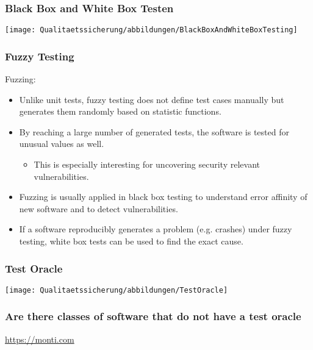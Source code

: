 
\begin{frame}
\frametitle{Black Box and White Box Testen}
  \begin{center}
  \texttt{[image: Qualitaetssicherung/abbildungen/BlackBoxAndWhiteBoxTesting]}
  \end{center}
\end{frame}


\begin{frame}
\frametitle{Fuzzy Testing}
Fuzzing:
\begin{itemize}
	\item Unlike unit tests, fuzzy testing does not define test cases manually but generates them randomly based on statistic functions.
	\item By reaching a large number of generated tests, the software is tested for unusual values as well.
\begin{itemize}
	\item This is especially interesting for uncovering security relevant vulnerabilities.
\end{itemize}
\item Fuzzing is usually applied in black box testing to understand error affinity of new software and to detect vulnerabilities.
\item If a software reproducibly generates a problem (e.g. crashes) under fuzzy testing, white box tests can be used to find the exact cause. 
\end{itemize}
\end{frame}


\begin{frame}
\frametitle{Test Oracle}
  \begin{center}
  \texttt{[image: Qualitaetssicherung/abbildungen/TestOracle]}
  \end{center}
\end{frame}


\begin{frame}
\frametitle{Are there classes of software that do not have a test oracle}
  \begin{center}
  \url{https://monti.com}  %
  \end{center}
\end{frame}


